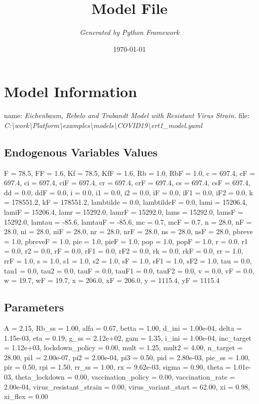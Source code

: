 \documentclass{article}%
\title{\textbf{Model File}}%
\author{\textit{Generated by Python Framework}}%
\date{\today}%
\begin{document}
%
\normalsize%
\maketitle%
\section{Model Information}%
\label{sec:ModelInformation}%
name: %
\textit{Eichenbaum, Rebelo and Trabandt Model with Resistant Virus Strain.}%
\newline%
file: %
\textit{C:\textbackslash{}work\textbackslash{}Platform\textbackslash{}examples\textbackslash{}models\textbackslash{}COVID19\textbackslash{}ert1\_model.yaml}%
\subsection{Endogenous Variables Values}%
\label{subsec:EndogenousVariablesValues}%
F = 78.5, FF = 1.6, Kf = 78.5, KfF = 1.6, Rb = 1.0, RbF = 1.0, c = 697.4, cF = 697.4, ci = 697.4, ciF = 697.4, cr = 697.4, crF = 697.4, cs = 697.4, csF = 697.4, dd = 0.0, ddF = 0.0, i = 0.0, i1 = 0.0, i2 = 0.0, iF = 0.0, iF1 = 0.0, iF2 = 0.0, k = 178551.2, kF = 178551.2, lambtilde = 0.0, lambtildeF = 0.0, lami = 15206.4, lamiF = 15206.4, lamr = 15292.0, lamrF = 15292.0, lams = 15292.0, lamsF = 15292.0, lamtau = {-}85.6, lamtauF = {-}85.6, mc = 0.7, mcF = 0.7, n = 28.0, nF = 28.0, ni = 28.0, niF = 28.0, nr = 28.0, nrF = 28.0, ns = 28.0, nsF = 28.0, pbreve = 1.0, pbreveF = 1.0, pie = 1.0, pieF = 1.0, pop = 1.0, popF = 1.0, r = 0.0, r1 = 0.0, r2 = 0.0, rF = 0.0, rF1 = 0.0, rF2 = 0.0, rk = 0.0, rkF = 0.0, rr = 1.0, rrF = 1.0, s = 1.0, s1 = 1.0, s2 = 1.0, sF = 1.0, sF1 = 1.0, sF2 = 1.0, tau = 0.0, tau1 = 0.0, tau2 = 0.0, tauF = 0.0, tauF1 = 0.0, tauF2 = 0.0, v = 0.0, vF = 0.0, w = 19.7, wF = 19.7, x = 206.0, xF = 206.0, y = 1115.4, yF = 1115.4

%
\subsection{Parameters}%
\label{subsec:Parameters}%
A = 2.15, Rb\_ss = 1.00, alfa = 0.67, betta = 1.00, d\_ini = 1.00e{-}04, delta = 1.15e{-}03, eta = 0.19, g\_ss = 2.12e+02, gam = 1.35, i\_ini = 1.00e{-}04, inc\_target = 1.12e+03, lockdown\_policy = 0.00, mult = 1.25, mult2 = 4.00, n\_target = 28.00, pi1 = 2.00e{-}07, pi2 = 2.00e{-}04, pi3 = 0.50, pid = 2.80e{-}03, pie\_ss = 1.00, pir = 0.50, rpi = 1.50, rr\_ss = 1.00, rx = 9.62e{-}03, sigma = 0.90, theta = 1.01e{-}03, theta\_lockdown = 0.00, vaccination\_policy = 0.00, vaccination\_rate = 2.00e{-}04, virus\_resistant\_strain = 0.00, virus\_variant\_start = 62.00, xi = 0.98, xi\_flex = 0.00
\end{document}
